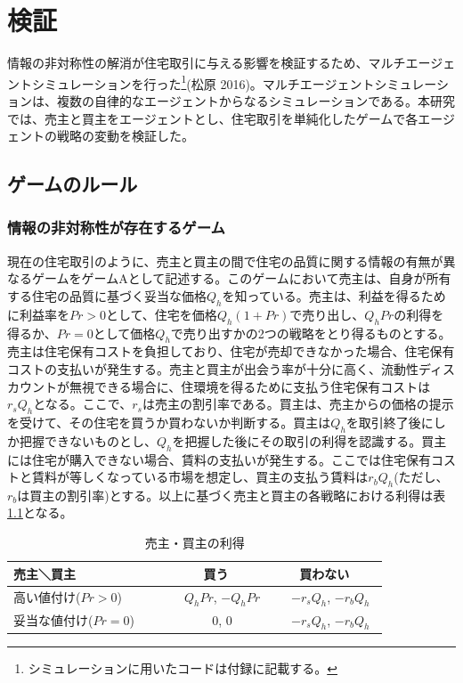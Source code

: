 \documentclass[a4paper,fontsize=11pt,report,notitlepage,line_length=38zw,number_of_lines=40,dvipdfmx]{jlreq}
\begin{document}
\chapter{検証}
情報の非対称性の解消が住宅取引に与える影響を検証するため、マルチエージェントシミュレーションを行った\footnote{シミュレーションに用いたコードは付録に記載する。}(松原 2016)\cite{matsubara2016}。マルチエージェントシミュレーションは、複数の自律的なエージェントからなるシミュレーションである。本研究では、売主と買主をエージェントとし、住宅取引を単純化したゲームで各エージェントの戦略の変動を検証した。

\section{ゲームのルール}
\subsection{情報の非対称性が存在するゲーム}
現在の住宅取引のように、売主と買主の間で住宅の品質に関する情報の有無が異なるゲームをゲームAとして記述する。このゲームにおいて売主は、自身が所有する住宅の品質に基づく妥当な価格$Q_h$を知っている。売主は、利益を得るために利益率を$Pr>0$として、住宅を価格$Q_h(1+Pr)$で売り出し、$Q_hPr$の利得を得るか、$Pr=0$として価格$Q_h$で売り出すかの2つの戦略をとり得るものとする。売主は住宅保有コストを負担しており、住宅が売却できなかった場合、住宅保有コストの支払いが発生する。売主と買主が出会う率が十分に高く、流動性ディスカウントが無視できる場合に、住環境を得るために支払う住宅保有コストは$r_sQ_h$となる。ここで、$r_s$は売主の割引率である。買主は、売主からの価格の提示を受けて、その住宅を買うか買わないか判断する。買主は$Q_h$を取引終了後にしか把握できないものとし、$Q_h$を把握した後にその取引の利得を認識する。買主には住宅が購入できない場合、賃料の支払いが発生する。ここでは住宅保有コストと賃料が等しくなっている市場を想定し、買主の支払う賃料は$r_bQ_h$(ただし、$r_b$は買主の割引率)とする。以上に基づく売主と買主の各戦略における利得は表\ref{ritokuA}となる。

\begin{table}
\begin{center}
\caption{売主・買主の利得}
\label{ritokuA}
\begin{tabular}{l|cc}
売主＼買主 & 買う & 買わない \\ \hline
高い値付け($Pr>0$)　　 & 　$Q_hPr$,  $-Q_hPr$ & 　$-r_sQ_h$,  $-r_bQ_h$　 \\
妥当な値付け($Pr=0$)　　 & 　0, 0 & 　$-r_sQ_h$,  $-r_bQ_h$　
\end{tabular}
\end{center}
\end{table}%
\end{document}
